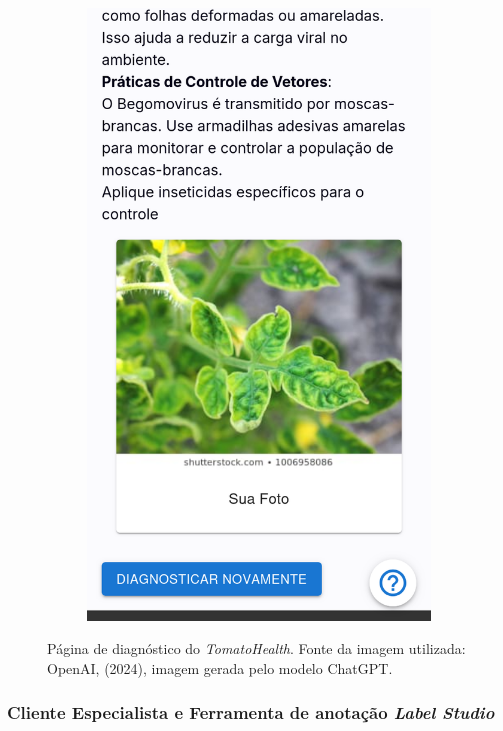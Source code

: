 \begin{figure}[htp]
\begin{subfigure}{0.3\textwidth}
        \includegraphics[width=\linewidth, height=0.4\textheight, keepaspectratio]{images/diagnostic6.png}
    \end{subfigure}
    
    \caption{Página de diagnóstico do \emph{TomatoHealth}. Fonte da imagem utilizada: OpenAI, (2024), imagem gerada pelo modelo ChatGPT.}        
    \label{fig:diagnostic}
\end{figure}


\subsubsection{Cliente Especialista e Ferramenta de anotação \emph{Label Studio}}

